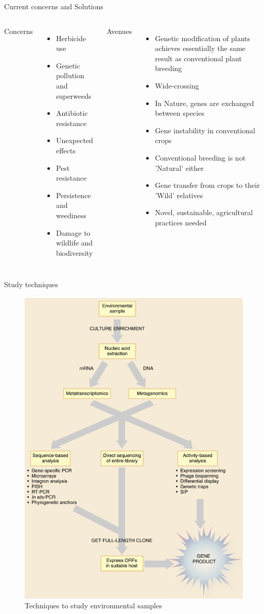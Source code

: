 \documentclass[
  ignorenonframetext,
  aspectratio=169]{beamer}
\begin{document}
\begin{frame}{Current concerns and Solutions}
\protect\hypertarget{current-concerns-and-solutions}{}
\begin{columns}[T,onlytextwidth]
  
  \alert {Concerns}
  \begin{itemize}
  \item Herbicide use
  \item Genetic pollution and superweeds
  \item Antibiotic resistance
  \item Unexpected effects
  \item Pest resistance
  \item Persistence and weediness
  \item Damage to wildlife and biodiversity
  \end{itemize}
  
  
  \alert {Avenues}
  \begin{itemize}
  \item Genetic modification of plants achieves essentially the same result as conventional plant breeding
  \item Wide-crossing
  \item In Nature, genes are exchanged between species
  \item Gene instability in conventional crops
  \item Conventional breeding is not 'Natural' either
  \item Gene transfer from crops to their 'Wild' relatives
  \item Novel, sustainable, agricultural practices needed
  
  \end{itemize}
  
\end{columns}
\end{frame}

\begin{frame}{Study techniques}
\protect\hypertarget{study-techniques}{}
\begin{figure}
\includegraphics[width=0.32\linewidth]{../images/environmental_techniques} \caption{Techniques to study environmental samples}\label{fig:environment-samples-study}
\end{figure}
\end{frame}
\end{document}
